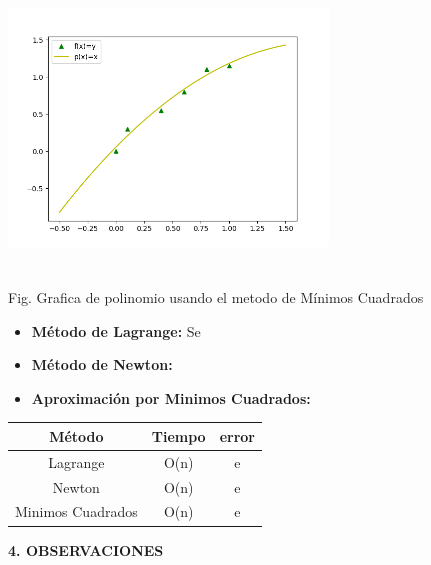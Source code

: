 \documentclass[10pt,a4paper]{article}
\begin{document}
\begin{multicols}{2}
		
		\begin{center}
			\includegraphics[width=8.5cm,height=7.5cm]{minCuadrados.png}
			
			Fig. Grafica de polinomio usando el metodo de Mínimos Cuadrados
		\end{center}
		
		
		\vspace*{0.2cm}
		\begin{itemize}
			\item \textbf{Método de Lagrange: } Se
			\item \textbf{Método de Newton: }
			\item \textbf{Aproximación por Minimos Cuadrados:}
		\end{itemize}
		
		\begin{center}
			\renewcommand{\tabcolsep}{10pt}
			\begin{tabular}{ |c|c|c| }
				\hline
				Método            & Tiempo & error  \\ \hline
				Lagrange          & O(n)                & e                      \\ \hline
				Newton            & O(n)                & e                      \\ \hline
				Minimos Cuadrados & O(n)                & e                      \\ \hline \end{tabular}
		\end{center}
		
	
		
		\begin{center}
			{\large \bf 4. OBSERVACIONES}
		\end{center}
		

\end{multicols}
\end{document}
